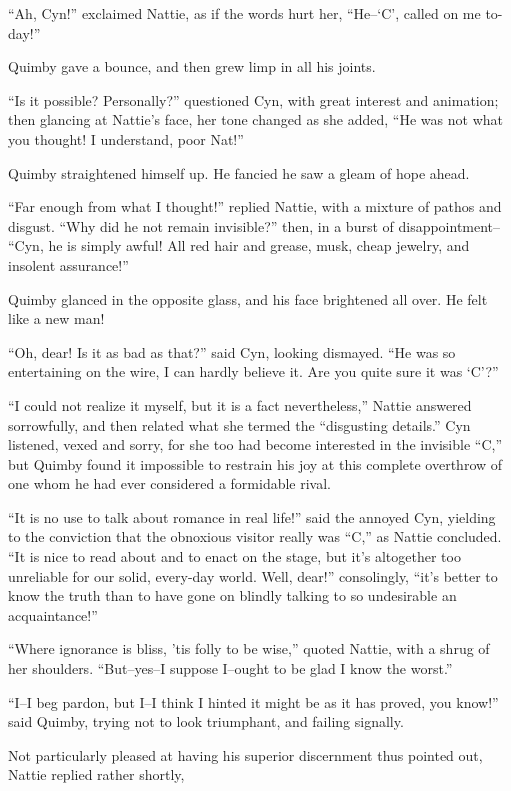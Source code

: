 ``Ah, Cyn!'' exclaimed Nattie, as if the words hurt her, ``He--`C', called
on me to-day!''

Quimby gave a bounce, and then grew limp in all his joints.

``Is it possible? Personally?'' questioned Cyn, with great interest and
animation; then glancing at Nattie's face, her tone changed as she
added, ``He was not what you thought! I understand, poor Nat!''

Quimby straightened himself up. He fancied he saw a gleam of hope ahead.

``Far enough from what I thought!'' replied Nattie, with a mixture of
pathos and disgust. ``Why did he not remain invisible?'' then, in a burst
of disappointment-- ``Cyn, he is simply awful! All red hair and grease,
musk, cheap jewelry, and insolent assurance!''

Quimby glanced in the opposite glass, and his face brightened all over.
He felt like a new man!

``Oh, dear! Is it as bad as that?'' said Cyn, looking dismayed. ``He was so
entertaining on the wire, I can hardly believe it. Are you quite sure it
was `C'?''

``I could not realize it myself, but it is a fact nevertheless,'' Nattie
answered sorrowfully, and then related what she termed the ``disgusting
details.'' Cyn listened, vexed and sorry, for she too had become
interested in the invisible ``C,'' but Quimby found it impossible to
restrain his joy at this complete overthrow of one whom he had ever
considered a formidable rival.

``It is no use to talk about romance in real life!'' said the annoyed Cyn,
yielding to the conviction that the obnoxious visitor really was ``C,'' as
Nattie concluded. ``It is nice to read about and to enact on the stage,
but it's altogether too unreliable for our solid, every-day world. Well,
dear!'' consolingly, ``it's better to know the truth than to have gone on
blindly talking to so undesirable an acquaintance!''

``Where ignorance is bliss, 'tis folly to be wise,'' quoted Nattie, with a
shrug of her shoulders. ``But--yes--I suppose I--ought to be glad I know
the worst.''

``I--I beg pardon, but I--I think I hinted it might be as it has proved,
you know!'' said Quimby, trying not to look triumphant, and failing
signally.

Not particularly pleased at having his superior discernment thus pointed
out, Nattie replied rather shortly,

